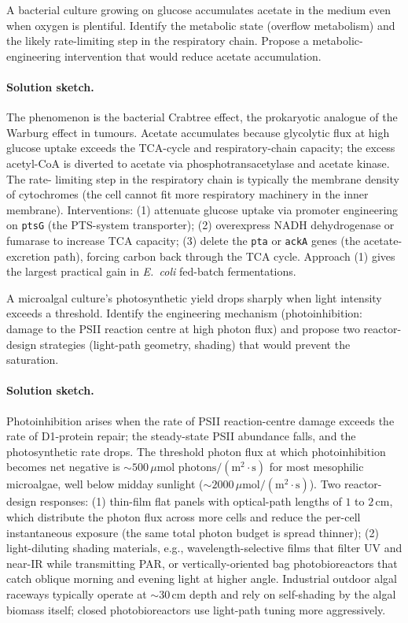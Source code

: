 \begin{exercise}
A bacterial culture growing on glucose accumulates acetate in the
medium even when oxygen is plentiful. Identify the metabolic state
(overflow metabolism) and the likely rate-limiting step in the
respiratory chain. Propose a metabolic-engineering intervention that
would reduce acetate accumulation.
\end{exercise}

\paragraph{Solution sketch.}
The phenomenon is the bacterial Crabtree effect, the prokaryotic
analogue of the Warburg effect in tumours. Acetate accumulates
because glycolytic flux at high glucose uptake exceeds the TCA-cycle
and respiratory-chain capacity; the excess acetyl-CoA is diverted to
acetate via phosphotransacetylase and acetate kinase. The rate-
limiting step in the respiratory chain is typically the membrane
density of cytochromes (the cell cannot fit more respiratory
machinery in the inner membrane). Interventions: (1) attenuate
glucose uptake via promoter engineering on \texttt{ptsG} (the
PTS-system transporter); (2) overexpress NADH dehydrogenase or
fumarase to increase TCA capacity; (3) delete the \texttt{pta} or
\texttt{ackA} genes (the acetate-excretion path), forcing carbon
back through the TCA cycle. Approach (1) gives the largest practical
gain in \emph{E.~coli} fed-batch fermentations.

\begin{exercise}
A microalgal culture's photosynthetic yield drops sharply when light
intensity exceeds a threshold. Identify the engineering mechanism
(photoinhibition: damage to the PSII reaction centre at high photon
flux) and propose two reactor-design strategies (light-path geometry,
shading) that would prevent the saturation.
\end{exercise}

\paragraph{Solution sketch.}
Photoinhibition arises when the rate of PSII reaction-centre damage
exceeds the rate of D1-protein repair; the steady-state PSII
abundance falls, and the photosynthetic rate drops. The threshold
photon flux at which photoinhibition becomes net negative is
$\sim 500\,\mu\text{mol photons}/(\text{m}^2 \cdot \text{s})$ for most
mesophilic microalgae, well below midday sunlight ($\sim 2000\,\mu
\text{mol}/(\text{m}^2 \cdot \text{s})$). Two reactor-design responses:
(1) thin-film flat panels with optical-path lengths of $1$ to
$2\,\text{cm}$, which distribute the photon flux across more cells
and reduce the per-cell instantaneous exposure (the same total
photon budget is spread thinner); (2) light-diluting shading
materials, e.g., wavelength-selective films that filter UV and
near-IR while transmitting PAR, or vertically-oriented bag
photobioreactors that catch oblique morning and evening light at
higher angle. Industrial outdoor algal raceways typically operate at
$\sim 30\,\text{cm}$ depth and rely on self-shading by the algal
biomass itself; closed photobioreactors use light-path tuning more
aggressively.


